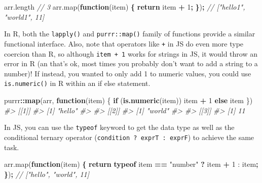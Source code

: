 \documentclass[
  12pt,
]{krantz}
\newenvironment{Shaded}{\begin{snugshade}}{\end{snugshade}}
\newcommand{\AttributeTok}[1]{\textcolor[rgb]{0.77,0.63,0.00}{#1}}
\newcommand{\CommentTok}[1]{\textcolor[rgb]{0.56,0.35,0.01}{\textit{#1}}}
\newcommand{\ControlFlowTok}[1]{\textcolor[rgb]{0.13,0.29,0.53}{\textbf{#1}}}
\newcommand{\DecValTok}[1]{\textcolor[rgb]{0.00,0.00,0.81}{#1}}
\newcommand{\KeywordTok}[1]{\textcolor[rgb]{0.13,0.29,0.53}{\textbf{#1}}}
\newcommand{\NormalTok}[1]{#1}
\newcommand{\OperatorTok}[1]{\textcolor[rgb]{0.81,0.36,0.00}{\textbf{#1}}}
\newcommand{\StringTok}[1]{\textcolor[rgb]{0.31,0.60,0.02}{#1}}
\newcommand{\VariableTok}[1]{\textcolor[rgb]{0.00,0.00,0.00}{#1}}
\begin{document}
\begin{Shaded}
\begin{Highlighting}[]
\VariableTok{arr}\NormalTok{.}\AttributeTok{length}
\CommentTok{// 3}
\VariableTok{arr}\NormalTok{.}\AttributeTok{map}\NormalTok{(}\KeywordTok{function}\NormalTok{(item) }\OperatorTok{\{} \ControlFlowTok{return}\NormalTok{ item }\OperatorTok{+} \DecValTok{1}\OperatorTok{;} \OperatorTok{\}}\NormalTok{)}\OperatorTok{;}
\CommentTok{// ["hello1", "world1", 11]}
\end{Highlighting}
\end{Shaded}

In R, both the \texttt{lapply()} and \texttt{purrr::map()} family of functions provide a similar functional interface. Also, note that operators like \texttt{+} in JS do even more type coercion than R, so although \texttt{item\ +\ 1} works for strings in JS, it would throw an error in R (an that's ok, most times you probably don't want to add a string to a number)! If instead, you wanted to only add 1 to numeric values, you could use \texttt{is.numeric()} in R within an if else statement.

\begin{Shaded}
\begin{Highlighting}[]
\NormalTok{purrr}\OperatorTok{::}\KeywordTok{map}\NormalTok{(arr, }\ControlFlowTok{function}\NormalTok{(item) \{}
  \ControlFlowTok{if}\NormalTok{ (}\KeywordTok{is.numeric}\NormalTok{(item)) item }\OperatorTok{+}\StringTok{ }\DecValTok{1} \ControlFlowTok{else}\NormalTok{ item}
\NormalTok{\})}
\CommentTok{#> [[1]]}
\CommentTok{#> [1] "hello"}
\CommentTok{#> }
\CommentTok{#> [[2]]}
\CommentTok{#> [1] "world"}
\CommentTok{#> }
\CommentTok{#> [[3]]}
\CommentTok{#> [1] 11}
\end{Highlighting}
\end{Shaded}

In JS, you can use the \texttt{typeof} keyword to get the data type as well as the conditional ternary operator (\texttt{condition\ ?\ exprT\ :\ exprF}) to achieve the same task.

\begin{Shaded}
\begin{Highlighting}[]
\VariableTok{arr}\NormalTok{.}\AttributeTok{map}\NormalTok{(}\KeywordTok{function}\NormalTok{(item) }\OperatorTok{\{} 
  \ControlFlowTok{return} \KeywordTok{typeof}\NormalTok{ item }\OperatorTok{==} \StringTok{"number"} \OperatorTok{?}\NormalTok{ item }\OperatorTok{+} \DecValTok{1}\NormalTok{ : item}\OperatorTok{;} 
\OperatorTok{\}}\NormalTok{)}\OperatorTok{;}
\CommentTok{// ["hello", "world", 11]}
\end{Highlighting}
\end{Shaded}
\end{document}
